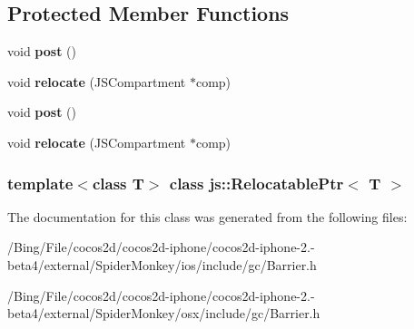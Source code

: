 \subsection*{Protected Member Functions}
\begin{DoxyCompactItemize}
\item 
\hypertarget{classjs_1_1_relocatable_ptr_a6ea7d313877a1fe72238ed8255e496c1}{void {\bfseries post} ()}\label{classjs_1_1_relocatable_ptr_a6ea7d313877a1fe72238ed8255e496c1}

\item 
\hypertarget{classjs_1_1_relocatable_ptr_abf85c855682198860adb7d7c2d8c8adc}{void {\bfseries relocate} (J\-S\-Compartment $\ast$comp)}\label{classjs_1_1_relocatable_ptr_abf85c855682198860adb7d7c2d8c8adc}

\item 
\hypertarget{classjs_1_1_relocatable_ptr_a6ea7d313877a1fe72238ed8255e496c1}{void {\bfseries post} ()}\label{classjs_1_1_relocatable_ptr_a6ea7d313877a1fe72238ed8255e496c1}

\item 
\hypertarget{classjs_1_1_relocatable_ptr_abf85c855682198860adb7d7c2d8c8adc}{void {\bfseries relocate} (J\-S\-Compartment $\ast$comp)}\label{classjs_1_1_relocatable_ptr_abf85c855682198860adb7d7c2d8c8adc}

\end{DoxyCompactItemize}
\subsubsection*{template$<$class T$>$ class js\-::\-Relocatable\-Ptr$<$ T $>$}



The documentation for this class was generated from the following files\-:\begin{DoxyCompactItemize}
\item 
/\-Bing/\-File/cocos2d/cocos2d-\/iphone/cocos2d-\/iphone-\/2.-\/beta4/external/\-Spider\-Monkey/ios/include/gc/Barrier.\-h\item 
/\-Bing/\-File/cocos2d/cocos2d-\/iphone/cocos2d-\/iphone-\/2.-\/beta4/external/\-Spider\-Monkey/osx/include/gc/Barrier.\-h\end{DoxyCompactItemize}
